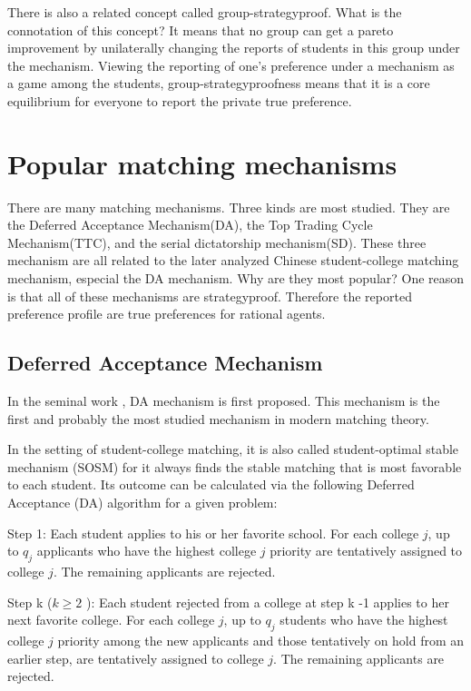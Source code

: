 There is also a related concept called group-strategyproof. What is the connotation of this concept? It means that no group can get a pareto improvement by unilaterally changing the reports of students in this group under the mechanism. Viewing the reporting of one's preference under a mechanism as a game among the students, group-strategyproofness means that it is a core equilibrium for everyone to report the private true preference.



\section{Popular matching mechanisms}
\label{equivalent direct mechanisms}
There are many matching mechanisms. Three kinds are
most studied. They are the Deferred Acceptance Mechanism(DA), the Top
Trading Cycle Mechanism(TTC), and the serial dictatorship mechanism(SD).
These three mechanism are all related to the later analyzed Chinese
student-college matching mechanism, especial the DA mechanism. Why are they most popular? 
One reason is that all of these mechanisms are
strategyproof. Therefore the reported preference profile are true preferences
for rational agents. 



\subsection{Deferred Acceptance Mechanism}
In the seminal work \parencite{Gale1962}, DA mechanism is first
proposed. This mechanism is the first and probably the most studied
mechanism in modern matching theory. 

In the setting of student-college matching, it is also called
student-optimal stable mechanism (SOSM) for it always finds the stable
matching that is most favorable to each student. Its outcome can be
calculated via the following Deferred
Acceptance (DA) algorithm for a given problem:

 Step 1: Each student applies to his or her favorite school. For each
college $j$, up to $q_j$  applicants who have
the highest college $j$ priority are tentatively assigned to college $j$. The remaining applicants are
rejected.

Step k ($ k \geq 2$ ): Each student rejected from a college at step k -1 applies to her next favorite college.
For each college $j$, up to $q_j$  students who have the highest college
$j$ priority among the new applicants and those tentatively on hold from an earlier step, are
tentatively assigned to college $j$. 
The remaining applicants are rejected.

